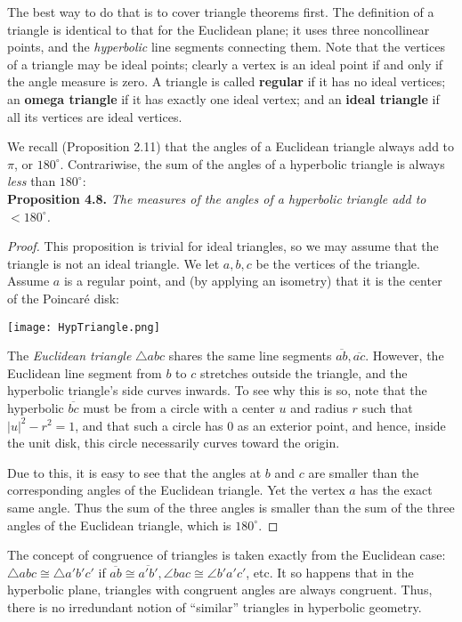 \documentclass[leqno]{book}
\begin{document}
\noindent The best way to do that is to cover triangle theorems first.  The definition of a triangle is identical to that for the Euclidean plane; it uses three noncollinear points, and the \emph{hyperbolic} line segments connecting them.  Note that the vertices of a triangle may be ideal points; clearly a vertex is an ideal point if and only if the angle measure is zero.  A triangle is called \textbf{regular} if it has no ideal vertices; an \textbf{omega triangle} if it has exactly one ideal vertex; and an \textbf{ideal triangle} if all its vertices are ideal vertices.

We recall (Proposition 2.11) that the angles of a Euclidean triangle always add to $\pi$, or $180^\circ$.  Contrariwise, the sum of the angles of a hyperbolic triangle is always \emph{less} than $180^\circ$:\\

\noindent\textbf{Proposition 4.8.} \emph{The measures of the angles of a hyperbolic triangle add to $<180^\circ$.}
\begin{proof}
This proposition is trivial for ideal triangles, so we may assume that the triangle is not an ideal triangle.  We let $a,b,c$ be the vertices of the triangle.  Assume $a$ is a regular point, and (by applying an isometry) that it is the center of the Poincar\'e disk:
\begin{center}\texttt{[image: HypTriangle.png]}\end{center}
The \emph{Euclidean triangle} $\triangle abc$ shares the same line segments $\overline{ab},\overline{ac}$.  However, the Euclidean line segment from $b$ to $c$ stretches outside the triangle, and the hyperbolic triangle's side curves inwards.  To see why this is so, note that the hyperbolic $\overline{bc}$ must be from a circle with a center $u$ and radius $r$ such that $|u|^2-r^2=1$, and that such a circle has $0$ as an exterior point, and hence, inside the unit disk, this circle necessarily curves toward the origin.

Due to this, it is easy to see that the angles at $b$ and $c$ are smaller than the corresponding angles of the Euclidean triangle.  Yet the vertex $a$ has the exact same angle.  Thus the sum of the three angles is smaller than the sum of the three angles of the Euclidean triangle, which is $180^\circ$.
\end{proof}

\noindent The concept of congruence of triangles is taken exactly from the Euclidean case: $\triangle abc\cong\triangle a'b'c'$ if $\overline{ab}\cong\overline{a'b'},\angle bac\cong\angle b'a'c'$, etc.  It so happens that in the hyperbolic plane, triangles with congruent angles are always congruent.  Thus, there is no irredundant notion of ``similar'' triangles in hyperbolic geometry.\\
\end{document}
